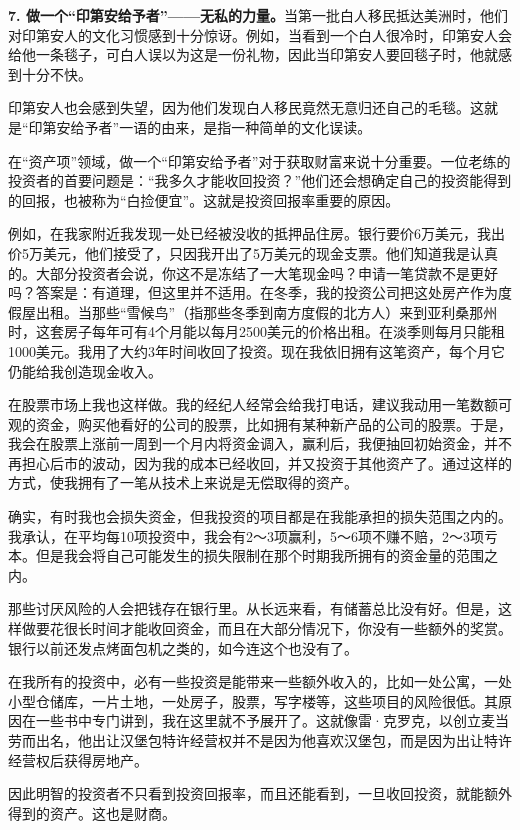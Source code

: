 \textbf{7. 做一个“印第安给予者”——无私的力量。}当第一批白人移民抵达美洲时，他们对印第安人的文化习惯感到十分惊讶。例如，当看到一个白人很冷时，印第安人会给他一条毯子，可白人误以为这是一份礼物，因此当印第安人要回毯子时，他就感到十分不快。

印第安人也会感到失望，因为他们发现白人移民竟然无意归还自己的毛毯。这就是“印第安给予者”一语的由来，是指一种简单的文化误读。

在“资产项”领域，做一个“印第安给予者”对于获取财富来说十分重要。一位老练的投资者的首要问题是：“我多久才能收回投资？”他们还会想确定自己的投资能得到的回报，也被称为“白捡便宜”。这就是投资回报率重要的原因。

例如，在我家附近我发现一处已经被没收的抵押品住房。银行要价6万美元，我出价5万美元，他们接受了，只因我开出了5万美元的现金支票。他们知道我是认真的。大部分投资者会说，你这不是冻结了一大笔现金吗？申请一笔贷款不是更好吗？答案是：有道理，但这里并不适用。在冬季，我的投资公司把这处房产作为度假屋出租。当那些“雪候鸟”（指那些冬季到南方度假的北方人）来到亚利桑那州时，这套房子每年可有4个月能以每月2500美元的价格出租。在淡季则每月只能租1000美元。我用了大约3年时间收回了投资。现在我依旧拥有这笔资产，每个月它仍能给我创造现金收入。

在股票市场上我也这样做。我的经纪人经常会给我打电话，建议我动用一笔数额可观的资金，购买他看好的公司的股票，比如拥有某种新产品的公司的股票。于是，我会在股票上涨前一周到一个月内将资金调入，赢利后，我便抽回初始资金，并不再担心后市的波动，因为我的成本已经收回，并又投资于其他资产了。通过这样的方式，使我拥有了一笔从技术上来说是无偿取得的资产。

确实，有时我也会损失资金，但我投资的项目都是在我能承担的损失范围之内的。我承认，在平均每10项投资中，我会有2～3项赢利，5～6项不赚不赔，2～3项亏本。但是我会将自己可能发生的损失限制在那个时期我所拥有的资金量的范围之内。

那些讨厌风险的人会把钱存在银行里。从长远来看，有储蓄总比没有好。但是，这样做要花很长时间才能收回资金，而且在大部分情况下，你没有一些额外的奖赏。银行以前还发点烤面包机之类的，如今连这个也没有了。

在我所有的投资中，必有一些投资是能带来一些额外收入的，比如一处公寓，一处小型仓储库，一片土地，一处房子，股票，写字楼等，这些项目的风险很低。其原因在一些书中专门讲到，我在这里就不予展开了。这就像雷·克罗克，以创立麦当劳而出名，他出让汉堡包特许经营权并不是因为他喜欢汉堡包，而是因为出让特许经营权后获得房地产。

因此明智的投资者不只看到投资回报率，而且还能看到，一旦收回投资，就能额外得到的资产。这也是财商。

